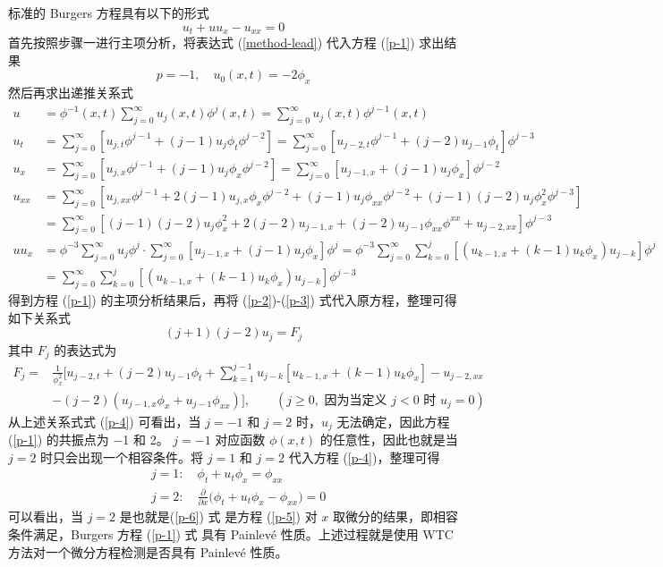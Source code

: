 标准的 Burgers 方程具有以下的形式
\begin{equation}
u_t + u u_x - u_{xx}=0  \label{p-1}
\end{equation}
首先按照步骤一进行主项分析，将表达式 (\ref{method-lead}) 代入方程 (\ref{p-1}) 求出结果
\begin{equation}
p=-1, \quad u_0(x,t)=-2 \phi_x
\end{equation}
然后再求出递推关系式
\begin{align}
u&=\phi^{-1}(x,t)\sum_{j=0}^{\infty}u_j(x,t)\phi^j(x,t)=\sum_{j=0}^{\infty}u_j(x,t)\phi^{j-1}(x,t) \label{p-2}\\
u_t&=\sum_{j=0}^{\infty}[u_{j,t}\phi^{j-1}+(j-1)u_j\phi_t\phi^{j-2}]=\sum_{j=0}^{\infty}[u_{j-2,t}\phi^{j-1}+(j-2)u_{j-1}\phi_t]\phi^{j-3} \\
u_x&=\sum_{j=0}^{\infty}[u_{j,x}\phi^{j-1}+(j-1)u_j\phi_x\phi^{j-2}]=\sum_{j=0}^{\infty}[u_{j-1,x}+(j-1)u_{j}\phi_x]\phi^{j-2} \\
u_{xx}&=\sum_{j=0}^{\infty}[u_{j,xx}\phi^{j-1}+2(j-1)u_{j,x}\phi_x\phi^{j-2}+(j-1)u_j\phi_{xx}\phi^{j-2}+(j-1)(j-2)u_j\phi_x^2\phi^{j-3}]\nonumber\\
&=\sum_{j=0}^{\infty}[(j-1)(j-2)u_{j}\phi_x^2+2(j-2)u_{j-1,x}+(j-2)u_{j-1}\phi_{xx}\phi^{xx}+u_{j-2,xx}]\phi^{j-3} \\
uu_x&=\phi^{-3}\sum_{j=0}^{\infty}u_j\phi^j\cdotp \sum_{j=0}^{\infty}[u_{j-1,x}+(j-1)u_j\phi_x]\phi^j =\phi^{-3}\sum_{j=0}^{\infty}\sum_{k=0}^{j}[(u_{k-1,x}+(k-1)u_k\phi_x)u_{j-k}]\phi^j\nonumber\\
&=\sum_{j=0}^{\infty}\sum_{k=0}^{j}[(u_{k-1,x}+(k-1)u_k\phi_x)u_{j-k}]\phi^{j-3}  \label{p-3}
\end{align}
得到方程 (\ref{p-1}) 的主项分析结果后，再将 (\ref{p-2})-(\ref{p-3}) 式代入原方程，整理可得如下关系式
\begin{equation}
(j+1)(j-2)u_j=F_j  \label{p-4}
\end{equation}
其中 $F_j$ 的表达式为
\begin{align}
F_j=&\frac{1}{\phi_x^2}\big[ u_{j-2,t} + (j-2) u_{j-1}\phi_t +\sum^{j-1}_{k=1} u_{j-k} [ u_{k-1,x} +
(k-1) u_k \phi_x] -u_{j-2,xx} \nonumber\\
&- (j-2)(u_{j-1,x} \phi_x +u_{j-1} \phi_{xx}) \big],  \qquad (j\geq 0, \mbox{ 因为当定义 }  j<0 \mbox{ 时 } u_j=0 )
\end{align}
从上述关系式式 (\ref{p-4}) 可看出，当 $j = −1$ 和 $j = 2$ 时，$u_j$ 无法确定，因此方程 (\ref{p-1}) 的共振点为 −1 和 2。 $j = −1$ 对应函数 $\phi(x,t)$ 的任意性，因此也就是当 $j = 2$ 时只会出现一个相容条件。将 $j = 1$ 和 $j = 2$ 代入方程 (\ref{p-4})，整理可得
\begin{align}
& j=1: \quad \phi_t +u_t \phi_x=\phi_{xx}  \label{p-5}\\
& j=2: \quad \frac{\partial}{\partial x}\big( \phi_t+u_t \phi_x - \phi_{xx} \big)=0 \label{p-6}
\end{align}
可以看出，当 $j = 2$ 是也就是(\ref{p-6}) 式 是方程 (\ref{p-5}) 对 $x$ 取微分的结果，即相容条件满足，Burgers 方程 (\ref{p-1}) 式 具有 Painlev\'{e} 性质。上述过程就是使用 WTC 方法对一个微分方程检测是否具有 Painlev\'{e} 性质。

